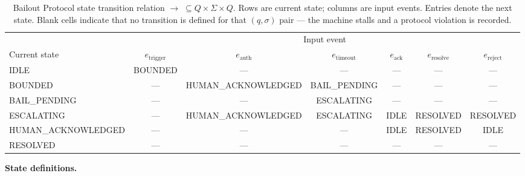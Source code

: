 \begin{table}[htbp]
\caption{Bailout Protocol state transition relation $\rightarrow \;\subseteq Q \times \Sigma \times Q$. Rows are current state; columns are input events. Entries denote the next state. Blank cells indicate that no transition is defined for that $(q, \sigma)$ pair --- the machine stalls and a protocol violation is recorded.}
\label{tab:bailout-transition}
\begin{tabular}{@{}lcccccc@{}}
\toprule
 & \multicolumn{6}{c}{Input event} \\
\cmidrule(l){2-7}
Current state & $e_{\text{trigger}}$ & $e_{\text{auth}}$ & $e_{\text{timeout}}$ & $e_{\text{ack}}$ & $e_{\text{resolve}}$ & $e_{\text{reject}}$ \\
\midrule
IDLE              & BOUNDED            & --- & --- & --- & --- & --- \\
BOUNDED           & --- & HUMAN\_ACKNOWLEDGED & BAIL\_PENDING & --- & --- & --- \\
BAIL\_PENDING     & --- & --- & ESCALATING & --- & --- & --- \\
ESCALATING        & --- & HUMAN\_ACKNOWLEDGED & ESCALATING & IDLE & RESOLVED & RESOLVED \\
HUMAN\_ACKNOWLEDGED & --- & --- & --- & IDLE & RESOLVED & IDLE \\
RESOLVED          & --- & --- & --- & --- & --- & --- \\
\bottomrule
\end{tabular}
\end{table}

\bigskip
\noindent\textbf{State definitions.}

